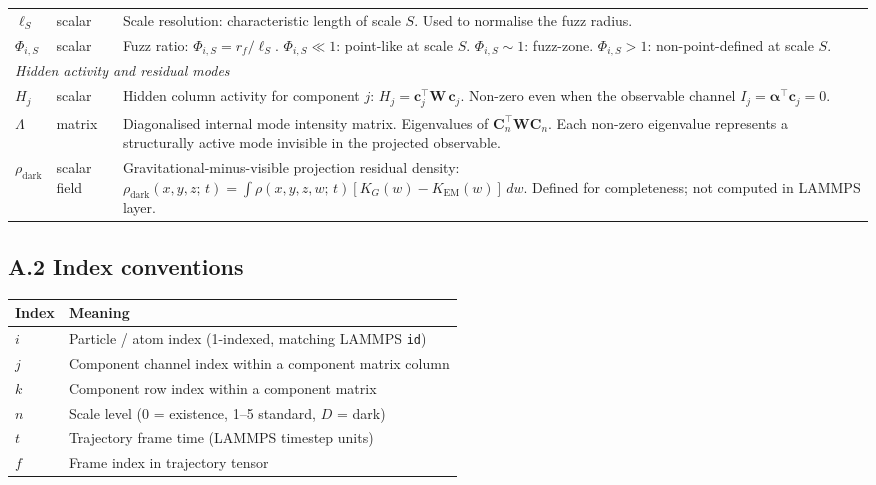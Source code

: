 \documentclass[11pt, a4paper, oneside]{article}
\newcommand{\FuzzR}{r_f}
\newcommand{\ScaleL}{\ell_S}
\newcommand{\FuzzRatio}{\Phi_{i,S}}
\newcommand{\HiddenAct}{H_j}
\newcommand{\DiagMode}{\Lambda}
\newcommand{\DarkDens}{\rho_{\mathrm{dark}}}
\begin{document}
\begin{appendices}
\begin{longtable}{p{3.2cm} p{2.2cm} p{8.8cm}}
  $\ScaleL$ & scalar &
	Scale resolution: characteristic length of scale $S$.
	Used to normalise the fuzz radius. \\[4pt]

  $\FuzzRatio$ & scalar &
	Fuzz ratio: $\FuzzRatio = \FuzzR / \ScaleL$.
	$\FuzzRatio \ll 1$: point-like at scale $S$.
	$\FuzzRatio \sim 1$: fuzz-zone.
	$\FuzzRatio > 1$: non-point-defined at scale $S$. \\[4pt]

  \midrule
  \multicolumn{3}{l}{\textit{Hidden activity and residual modes}} \\
  \midrule

  $\HiddenAct$ & scalar &
	Hidden column activity for component $j$:
	$H_j = \mathbf{c}_j^\top \mathbf{W}\, \mathbf{c}_j$.
	Non-zero even when the observable channel
	$I_j = \bm{\alpha}^\top \mathbf{c}_j = 0$. \\[4pt]

  $\DiagMode$ & matrix &
	Diagonalised internal mode intensity matrix.
	Eigenvalues of $\mathbf{C}_n^\top \mathbf{W} \mathbf{C}_n$.
	Each non-zero eigenvalue represents a structurally active
	mode invisible in the projected observable. \\[4pt]

  $\DarkDens$ & scalar field &
	Gravitational-minus-visible projection residual density:
	$\DarkDens(x,y,z;\,t) = \int \rho(x,y,z,w;\,t)
	[K_G(w) - K_{\mathrm{EM}}(w)]\,dw$.
	Defined for completeness; not computed in LAMMPS layer. \\[4pt]

  \bottomrule
\end{longtable}

\subsection*{A.2 Index conventions}

\begin{tabular}{ll}
  \toprule
  Index & Meaning \\
  \midrule
  $i$ & Particle / atom index (1-indexed, matching LAMMPS \texttt{id}) \\
  $j$ & Component channel index within a component matrix column \\
  $k$ & Component row index within a component matrix \\
  $n$ & Scale level (0 = existence, 1--5 standard, $D$ = dark) \\
  $t$ & Trajectory frame time (LAMMPS timestep units) \\
  $f$ & Frame index in trajectory tensor \\
  \bottomrule
\end{tabular}


\end{appendices}
\end{document}
